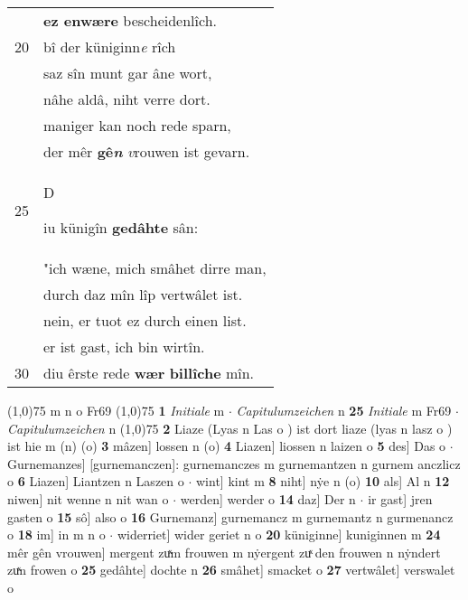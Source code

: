 \documentclass[8pt,a4paper,notitlepage]{article}
\begin{document}
\begin{table}[ht]
\begin{minipage}[t]{0.5\linewidth}
\begin{tabular}{rl}
 & \textbf{ez enwære} bescheidenlîch.\\ 
20 & bî der küniginn\textit{e} rîch\\ 
 & saz sîn munt gar âne wort,\\ 
 & nâhe aldâ, niht verre dort.\\ 
 & maniger kan noch rede sparn,\\ 
 & der mêr \textbf{gê\textit{n}} \textit{v}rouwen ist gevarn.\\ 
25 & \begin{large}D\end{large}iu künigîn \textbf{gedâhte} sân:\\ 
 & "ich wæne, mich smâhet dirre man,\\ 
 & durch daz mîn lîp vertwâlet ist.\\ 
 & nein, er tuot ez durch einen list.\\ 
 & er ist gast, ich bin wirtîn.\\ 
30 & diu êrste rede \textbf{wær} \textbf{billîche} mîn.\\ 
\end{tabular}
\scriptsize
\line(1,0){75} \newline
m n o Fr69 \newline
\line(1,0){75} \newline
\textbf{1} \textit{Initiale} m   $\cdot$ \textit{Capitulumzeichen} n  \textbf{25} \textit{Initiale} m Fr69   $\cdot$ \textit{Capitulumzeichen} n  \newline
\line(1,0){75} \newline
\textbf{2} Liaze (Lyas n Las o ) ist dort liaze (lyas n lasz o ) ist hie m (n) (o) \textbf{3} mâzen] lossen n (o) \textbf{4} Liazen] liossen n laizen o \textbf{5} des] Das o  $\cdot$ Gurnemanzes] [gurnemanczen]: gurnemanczes m gurnemantzen n gurnem anczlicz o \textbf{6} Liazen] Liantzen n Laszen o  $\cdot$ wint] kint m \textbf{8} niht] nẏe n (o) \textbf{10} als] Al n \textbf{12} niwen] nit wenne n nit wan o  $\cdot$ werden] werder o \textbf{14} daz] Der n  $\cdot$ ir gast] jren gasten o \textbf{15} sô] also o \textbf{16} Gurnemanz] gurnemancz m gurnemantz n gurmenancz o \textbf{18} im] in m n o  $\cdot$ widerriet] wider geriet n o \textbf{20} küniginne] kuniginnen m \textbf{24} mêr gên vrouwen] mergent zuͯm frouwen m nẏergent zuͯ den frouwen n nẏndert zuͯn frowen o \textbf{25} gedâhte] dochte n \textbf{26} smâhet] smacket o \textbf{27} vertwâlet] verswalet o \newline
\end{minipage}
\end{table}
\end{document}
